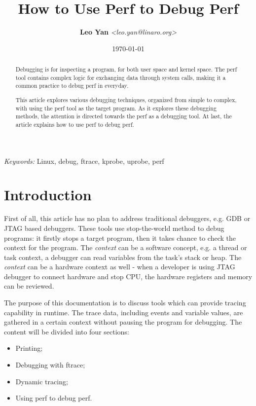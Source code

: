 \documentclass[11pt]{diazessay} %
\title{\textbf{How to Use Perf to Debug Perf}}
\author{\textbf{Leo Yan} \textit{<leo.yan@linaro.org>}} %
\date{\today} %
\begin{document}
\maketitle %


\begin{abstract}
Debugging is for inspecting a program, for both user space and kernel space.
The perf tool contains complex logic for exchanging data through system calls,
making it a common practice to debug perf in everyday.

This article explores various debugging techniques, organized from simple to
complex, with using the perf tool as the target program. As it explores these
debugging methods, the attention is directed towards the perf as a debugging
tool. At last, the article explains how to use perf to debug perf.
\end{abstract}

\hspace*{3.6mm}\textit{Keywords: } Linux, debug, ftrace, kprobe, uprobe, perf
\vspace{30pt} %


\section*{Introduction}

First of all, this article has no plan to address traditional debuggers, e.g.
GDB or JTAG based debuggers. These tools use stop-the-world method to debug
programs: it firstly stops a target program, then it takes chance to check
the context for the program. The \textit{context} can be a software concept,
e.g. a thread or task context, a debugger can read variables from the task's
stack or heap. The \textit{context} can be a hardware context as well - when
a developer is using JTAG debugger to connect hardware and stop CPU, the
hardware registers and memory can be reviewed.

The purpose of this documentation is to discuss tools which can provide
tracing capability in runtime. The trace data, including events and variable
values, are gathered in a certain context without pausing the program for
debugging. The content will be divided into four sections:
\begin{itemize}
	\item Printing;
	\item Debugging with ftrace;
	\item Dynamic tracing;
	\item Using perf to debug perf.
\end{itemize}
\end{document}
